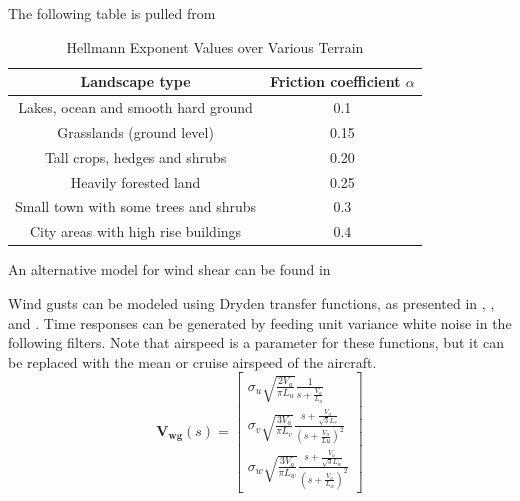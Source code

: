The following table is pulled from \cite{Banuelos-Ruedas2011}

\begin{table}[H]
\centering
\begin{tabular}{|c|c|}
	\hline
	           Landscape type             & Friction coefficient $\alpha$ \\ \hline
	 Lakes, ocean and smooth hard ground  &              0.1              \\ \hline
	      Grasslands (ground level)       &             0.15              \\ \hline
	    Tall crops, hedges and shrubs     &             0.20              \\ \hline
	        Heavily forested land         &             0.25              \\ \hline
	Small town with some trees and shrubs &              0.3              \\ \hline
	 City areas with high rise buildings  &              0.4              \\ \hline
\end{tabular} 
\caption{Hellmann Exponent Values over Various Terrain}
\end{table}

An alternative model for wind shear can be found in \cite{Moorhouse1982}

Wind gusts can be modeled using Dryden transfer functions, as presented in \cite{Moorhouse1982}, \cite{BEAL1993}, \cite{MathWorks:DrydenTurbulence} and \cite{Beard2012} . Time responses can be generated by feeding unit variance white noise in the following filters. Note that airspeed is a parameter for these functions, but it can be replaced with the mean or cruise airspeed of the aircraft.
\begin{equation}
	\bm{V_{wg}}(s) =
	\begin{bmatrix}
		\sigma_u \sqrt{\frac{2V_a}{\pi L_u}} \frac{1}{s + \frac{V_a}{L_u}}\\
		\sigma_v \sqrt{\frac{3V_a}{\pi L_v}} \frac{s+\frac{V_a}{\sqrt{3}L_v}}{(s+\frac{V_a}{Lu})^2} \\
		\sigma_w \sqrt{\frac{3V_a}{\pi L_w}} \frac{s+\frac{V_a}{\sqrt{3}L_w}}{(s+\frac{V_a}{L_w})^2}
	\end{bmatrix}
\end{equation}


